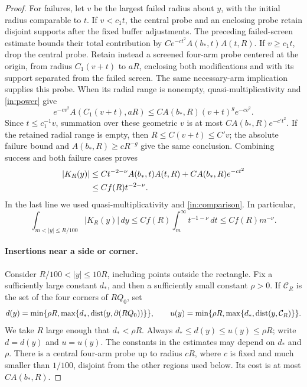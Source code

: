 \begin{proof}
For failures, let $v$ be the largest failed radius about $y$, with
the initial radius comparable to $t$. If $v<c_1t$, the
central probe and an enclosing
probe retain disjoint supports after the fixed buffer adjustments.
The preceding failed-screen estimate bounds their total
contribution by $Ce^{-ct^2}A(b_*,t)A(t,R)$.
If $v\ge c_1t$, drop the central probe. Retain instead a screened
four-arm probe centered at the origin, from radius $C_1(v+t)$
to $aR$, enclosing both modifications and with its support
separated from the failed screen. The same necessary-arm
implication supplies this probe. When its radial range is nonempty,
quasi-multiplicativity and \eqref{in:power} give
\[
 e^{-cv^2}A(C_1(v+t),aR)
 \le C A(b_*,R)(v+t)^g e^{-cv^2}.
\]
Since $t\le c_1^{-1}v$, summation over these geometric $v$ is
at most $C A(b_*,R)e^{-c't^2}$. If the retained radial range
is empty, then $R\le C(v+t)\le C'v$; the absolute failure
bound and $A(b_*,R)\ge cR^{-g}$ give the same conclusion.
Combining success and both failure cases proves
\begin{align}
 |K_R(y)|
 &\le Ct^{-2-\nu}A(b_*,t)A(t,R)
             +C A(b_*,R)e^{-ct^2}\notag\\
 &\le C f(R)t^{-2-\nu}.
 \label{cl:bulk-kernel}
\end{align}
In the last line we used quasi-multiplicativity and
\eqref{in:comparison}. In particular,
\begin{equation}\label{cl:bulk-integral}
 \int_{m<|y|\le R/100}|K_R(y)|\,dy
 \le C f(R)\int_m^\infty t^{-1-\nu}\,dt
 \le C f(R)m^{-\nu}.
\end{equation}

\paragraph{Insertions near a side or corner.}
Consider $R/100<|y|\le10R$, including points outside the rectangle.
Fix a sufficiently large constant $d_*$, and then a sufficiently
small constant $\rho>0$. If $\mathcal C_R$ is the set of the four
corners of $RQ_0$, set
\[
 d(y)=\min\{\rho R,\max\{d_*,\operatorname{dist}(y,\partial(RQ_0))\}\},
 \qquad
 u(y)=\min\{\rho R,\max\{d_*,\operatorname{dist}(y,\mathcal C_R)\}\}.
\]
We take $R$ large enough that $d_*<\rho R$. Always
$d_*\le d(y)\le u(y)\le\rho R$; write $d=d(y)$ and $u=u(y)$.
The constants in the estimates may depend on $d_*$ and $\rho$.
There is a central four-arm probe up to radius $cR$, where $c$
is fixed and much smaller than $1/100$, disjoint from the other
regions used below. Its cost is at most $CA(b_*,R)$.


\end{proof}
